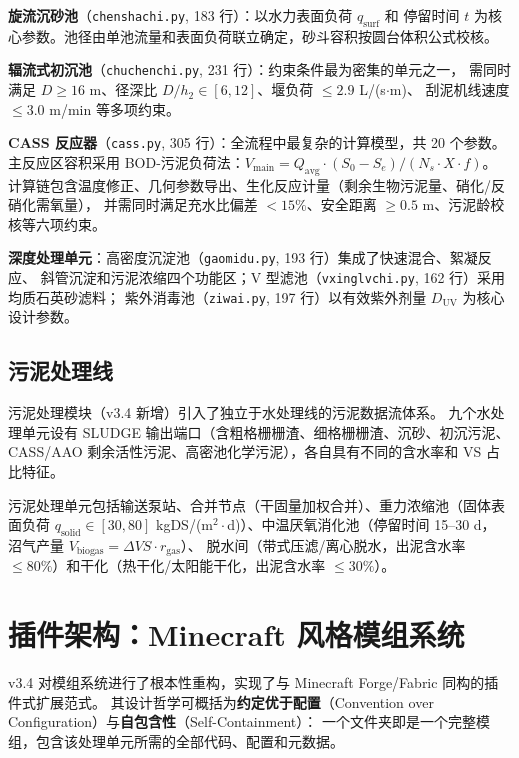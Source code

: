 \documentclass[12pt,a4paper]{ctexart}
\theoremstyle{definition}
\theoremstyle{remark}
\begin{document}
\textbf{旋流沉砂池}（\texttt{chenshachi.py}, 183 行）：以水力表面负荷 $q_{\text{surf}}$ 和
停留时间 $t$ 为核心参数。池径由单池流量和表面负荷联立确定，砂斗容积按圆台体积公式校核。

\textbf{辐流式初沉池}（\texttt{chuchenchi.py}, 231 行）：约束条件最为密集的单元之一，
需同时满足 $D \ge 16$ m、径深比 $D/h_2 \in [6, 12]$、堰负荷 $\le 2.9$ L/(s$\cdot$m)、
刮泥机线速度 $\le 3.0$ m/min 等多项约束。

\textbf{CASS 反应器}（\texttt{cass.py}, 305 行）：全流程中最复杂的计算模型，共 20 个参数。
主反应区容积采用 BOD-污泥负荷法：$V_{\text{main}} = Q_{\text{avg}} \cdot (S_0 - S_e) / (N_s \cdot X \cdot f)$。
计算链包含温度修正、几何参数导出、生化反应计量（剩余生物污泥量、硝化/反硝化需氧量），
并需同时满足充水比偏差 $< 15\%$、安全距离 $\ge 0.5$ m、污泥龄校核等六项约束。

\textbf{深度处理单元}：高密度沉淀池（\texttt{gaomidu.py}, 193 行）集成了快速混合、絮凝反应、
斜管沉淀和污泥浓缩四个功能区；V 型滤池（\texttt{vxinglvchi.py}, 162 行）采用均质石英砂滤料；
紫外消毒池（\texttt{ziwai.py}, 197 行）以有效紫外剂量 $D_{\text{UV}}$ 为核心设计参数。

\subsection{污泥处理线}

污泥处理模块（v3.4 新增）引入了独立于水处理线的污泥数据流体系。
九个水处理单元设有 SLUDGE 输出端口（含粗格栅栅渣、细格栅栅渣、沉砂、初沉污泥、
CASS/AAO 剩余活性污泥、高密池化学污泥），各自具有不同的含水率和 VS 占比特征。

污泥处理单元包括输送泵站、合并节点（干固量加权合并）、重力浓缩池（固体表面负荷
$q_{\text{solid}} \in [30, 80]$ kgDS/(m$^2\cdot$d)）、中温厌氧消化池（停留时间 15--30 d，
沼气产量 $V_{\text{biogas}} = \Delta VS \cdot r_{\text{gas}}$）、
脱水间（带式压滤/离心脱水，出泥含水率 $\le 80\%$）和干化（热干化/太阳能干化，出泥含水率 $\le 30\%$）。

\section{插件架构：Minecraft 风格模组系统}\label{sec:mod-system}

v3.4 对模组系统进行了根本性重构，实现了与 Minecraft Forge/Fabric 同构的插件式扩展范式。
其设计哲学可概括为\textbf{约定优于配置}（Convention over Configuration）与\textbf{自包含性}（Self-Containment）：
一个文件夹即是一个完整模组，包含该处理单元所需的全部代码、配置和元数据。
\end{document}
